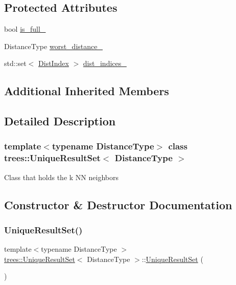 \subsection*{Protected Attributes}
\begin{DoxyCompactItemize}
\item 
bool \hyperlink{classtrees_1_1_unique_result_set_a4d9baa438af8d132f30676f25c5900b4}{is\+\_\+full\+\_\+}
\item 
Distance\+Type \hyperlink{classtrees_1_1_unique_result_set_acdfe562ad6f99ae5f68b7e8af3d68171}{worst\+\_\+distance\+\_\+}
\item 
std\+::set$<$ \hyperlink{structtrees_1_1_unique_result_set_1_1_dist_index}{Dist\+Index} $>$ \hyperlink{classtrees_1_1_unique_result_set_a3a3dd371f4861f0addcfabe8c68ec11c}{dist\+\_\+indices\+\_\+}
\end{DoxyCompactItemize}
\subsection*{Additional Inherited Members}


\subsection{Detailed Description}
\subsubsection*{template$<$typename Distance\+Type$>$\newline
class trees\+::\+Unique\+Result\+Set$<$ Distance\+Type $>$}

Class that holds the k NN neighbors 

\subsection{Constructor \& Destructor Documentation}
\mbox{\label{classtrees_1_1_unique_result_set_ad1f538e2dcaa431612d537efefc6699e}} 
\subsubsection{\texorpdfstring{Unique\+Result\+Set()}{UniqueResultSet()}}
{\footnotesize\ttfamily template$<$typename Distance\+Type $>$ \\
\hyperlink{classtrees_1_1_unique_result_set}{trees\+::\+Unique\+Result\+Set}$<$ Distance\+Type $>$\+::\hyperlink{classtrees_1_1_unique_result_set}{Unique\+Result\+Set} (\begin{DoxyParamCaption}{ }\end{DoxyParamCaption})\hspace{0.3cm}{\ttfamily [inline]}}

